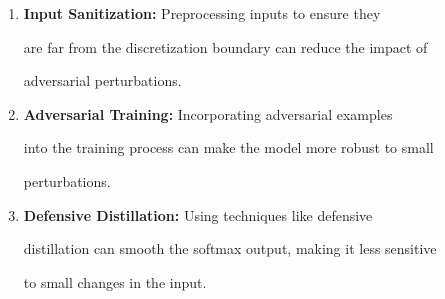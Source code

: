 \documentclass[11pt]{article}
\theoremstyle{definition}
\begin{document}
\begin{enumerate}






    \item \textbf{Input Sanitization:} Preprocessing inputs to ensure they






    are far from the discretization boundary can reduce the impact of






    adversarial perturbations.






    






    \item \textbf{Adversarial Training:} Incorporating adversarial examples






    into the training process can make the model more robust to small






    perturbations.






    






    \item \textbf{Defensive Distillation:} Using techniques like defensive






    distillation can smooth the softmax output, making it less sensitive






    to small changes in the input.






\end{enumerate}
\end{document}
